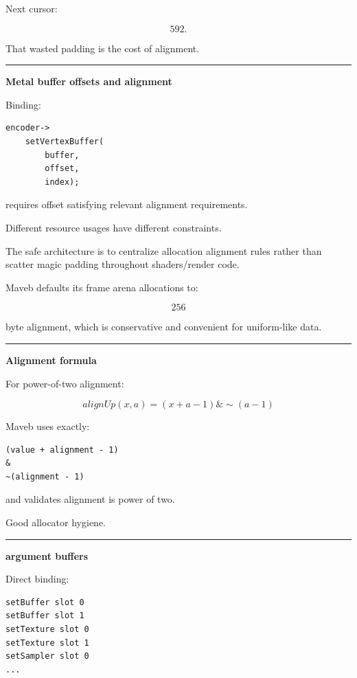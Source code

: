 Next cursor:

\[
592.
\]

That wasted padding is the cost of alignment.

\begin{center}\rule{0.5\linewidth}{0.5pt}\end{center}

\textbf{Metal buffer offsets and alignment}

Binding:

\begin{verbatim}
encoder->
    setVertexBuffer(
        buffer,
        offset,
        index);
\end{verbatim}

requires offset satisfying relevant alignment requirements.

Different resource usages have different constraints.

The safe architecture is to centralize allocation alignment rules rather than scatter magic padding throughout shaders/render code.

Maveb defaults its frame arena allocations to:

\[
256
\]

byte alignment, which is conservative and convenient for uniform-like data.

\begin{center}\rule{0.5\linewidth}{0.5pt}\end{center}

\textbf{Alignment formula}

For power-of-two alignment:

\[
\boxed{
alignUp(x,a)
=
(x+a-1)\&
\sim(a-1)
}
\]

Maveb uses exactly:

\begin{verbatim}
(value + alignment - 1)
&
~(alignment - 1)
\end{verbatim}

and validates alignment is power of two.

Good allocator hygiene.

\begin{center}\rule{0.5\linewidth}{0.5pt}\end{center}

\textbf{argument buffers}

Direct binding:

\begin{verbatim}
setBuffer slot 0
setBuffer slot 1
setTexture slot 0
setTexture slot 1
setSampler slot 0
...
\end{verbatim}

